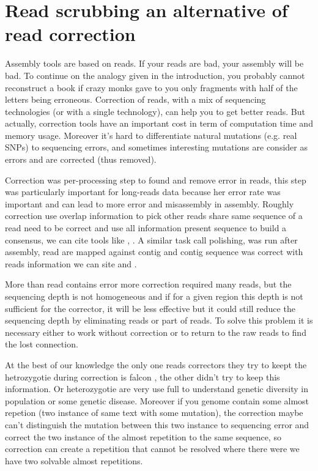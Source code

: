 \documentclass[main.tex]{subfiles}
\begin{document}
\section{Read scrubbing an alternative of read correction} \label{sec:preasm:intro_yacrd}

Assembly tools are based on reads. If your reads are bad, your assembly will be bad. To continue on the analogy given in the introduction, you probably cannot reconstruct a book if crazy monks gave to you only fragments with half of the letters being erroneous. Correction of reads, with a mix of sequencing technologies (or with a single technology), can help you to get better reads. But actually, correction tools have an important cost in term of computation time and memory usage. Moreover it's hard to differentiate natural mutations (e.g. real SNPs) to sequencing errors, and sometimes interesting mutations are consider as errors and are corrected (thus removed).

Correction was per-processing step to found and remove error in reads, this step was particularly important for long-reads data because her error rate was important and can lead to more error and misassembly in assembly. Roughly correction use overlap information to pick other reads share same sequence of a read need to be correct and use all information present sequence to build a consensus, we can cite tools like \cite{MECAT}, \cite{CONSENT}. A similar task call polishing, was run after assembly, read are mapped against contig and contig sequence was correct with reads information we can site \cite{racon} and .

More than read contains error more correction required many reads, but the sequencing depth is not homogeneous and if for a given region this depth is not sufficient for the corrector, it will be less effective but it could still reduce the sequencing depth by eliminating reads or part of reads. To solve this problem it is necessary either to work without correction or to return to the raw reads to find the lost connection.

At the best of our knowledge the only one reads correctors they try to keept the hetrozygotie during correction is falcon \cite{falcon}, the other didn't try to keep this information. Or heterozygotie are very use full to understand genetic diversity in population or some genetic disease.
Moreover if you genome contain some almost repetion (two instance of same text with some mutation), the correction maybe can't distinguish the mutation between this two instance to sequencing error and correct the two instance of the almost repetition to the same sequence, so correction can create a repetition that cannot be resolved where there were we have two solvable almost repetitions.
\end{document}
